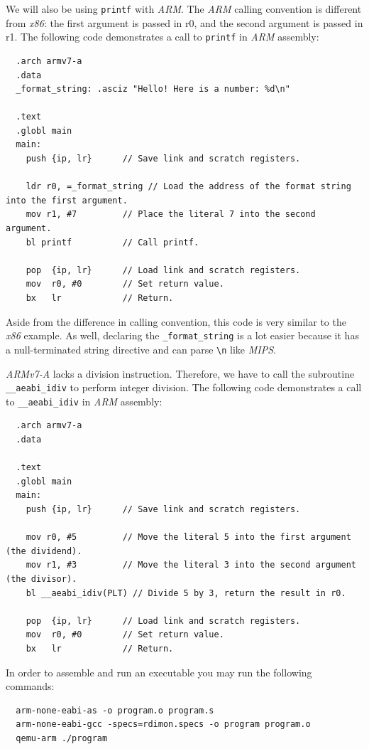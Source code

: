 \documentclass{article}
\newcommand{\code}[1]{\texttt{\textmd{#1}}}
\begin{document}
We will also be using \code{printf} with \textit{ARM}. The \textit{ARM} calling convention is
different from \textit{x86}: the first argument is passed in r0, and the second argument is passed
in r1. The following code demonstrates a call to \code{printf} in \textit{ARM} assembly:
\begin{lstlisting}
  .arch armv7-a
  .data
  _format_string: .asciz "Hello! Here is a number: %d\n"

  .text
  .globl main
  main:
    push {ip, lr}      // Save link and scratch registers.

    ldr r0, =_format_string // Load the address of the format string into the first argument.
    mov r1, #7         // Place the literal 7 into the second argument.
    bl printf          // Call printf.

    pop  {ip, lr}      // Load link and scratch registers.
    mov  r0, #0        // Set return value.
    bx   lr            // Return.
\end{lstlisting}

Aside from the difference in calling convention, this code is very similar to the \textit{x86}
example. As well, declaring the \code{\_format\_string} is a lot easier because it has a
null-terminated string directive and can parse \code{\textbackslash n} like \textit{MIPS}.

\textit{ARMv7-A} lacks a division instruction. Therefore, we have to call the subroutine
\code{\_\_aeabi\_idiv} to perform integer division. The following code demonstrates a call to
\code{\_\_aeabi\_idiv} in \textit{ARM} assembly:

\begin{lstlisting}
  .arch armv7-a
  .data

  .text
  .globl main
  main:
    push {ip, lr}      // Save link and scratch registers.

    mov r0, #5         // Move the literal 5 into the first argument (the dividend).
    mov r1, #3         // Move the literal 3 into the second argument (the divisor).
    bl __aeabi_idiv(PLT) // Divide 5 by 3, return the result in r0.

    pop  {ip, lr}      // Load link and scratch registers.
    mov  r0, #0        // Set return value.
    bx   lr            // Return.
\end{lstlisting}

In order to assemble and run an executable you may run the following commands:
\begin{lstlisting}
  arm-none-eabi-as -o program.o program.s
  arm-none-eabi-gcc -specs=rdimon.specs -o program program.o
  qemu-arm ./program
\end{lstlisting}
\end{document}
